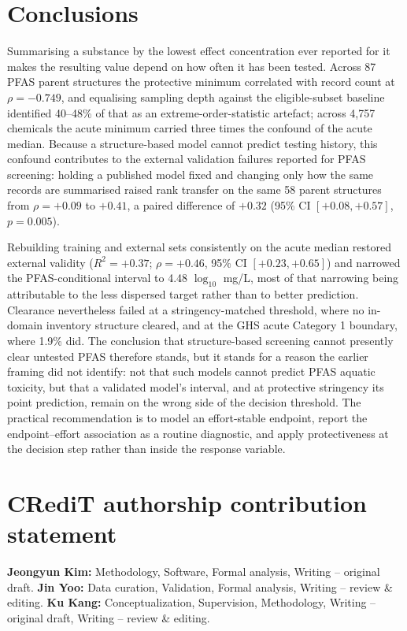 \documentclass[preprint,12pt]{elsarticle}
\begin{document}
\section{Conclusions}

Summarising a substance by the lowest effect concentration ever reported for it
makes the resulting value depend on how often it has been tested. Across 87
PFAS parent structures the protective minimum correlated with record count at
$\rho=-0.749$, and equalising sampling depth against the eligible-subset
baseline identified 40--48\% of that as an extreme-order-statistic artefact;
across 4{,}757 chemicals the acute minimum carried three times the confound of
the acute median. Because a structure-based model cannot predict testing
history, this confound contributes to the external validation failures reported
for PFAS screening: holding a published model fixed and changing only how the
same records are summarised raised rank transfer on the same 58 parent
structures from $\rho=+0.09$ to $+0.41$, a paired difference of $+0.32$
(95\% CI $[+0.08,+0.57]$, $p=0.005$).

Rebuilding training and external sets consistently on the acute median restored
external validity ($R^2=+0.37$; $\rho=+0.46$, 95\% CI $[+0.23,+0.65]$) and
narrowed the PFAS-conditional interval to 4.48 $\log_{10}$ mg/L, most of that
narrowing being attributable to the less dispersed target rather than to better
prediction. Clearance
nevertheless failed at a stringency-matched threshold, where no in-domain
inventory structure cleared, and at the GHS acute Category 1 boundary, where
1.9\% did. The conclusion that structure-based screening cannot presently clear
untested PFAS therefore stands, but it stands for a reason the earlier framing
did not identify: not that such models cannot predict PFAS aquatic toxicity, but
that a validated model's interval, and at protective stringency its point
prediction, remain on the wrong side of the decision threshold. The practical
recommendation is to model an effort-stable endpoint, report the
endpoint--effort association as a routine diagnostic, and apply protectiveness
at the decision step rather than inside the response variable.

\section*{CRediT authorship contribution statement}
\textbf{Jeongyun Kim:} Methodology, Software, Formal analysis, Writing --
original draft. \textbf{Jin Yoo:} Data curation, Validation, Formal analysis,
Writing -- review \& editing. \textbf{Ku Kang:} Conceptualization, Supervision,
Methodology, Writing -- original draft, Writing -- review \& editing.
\end{document}
